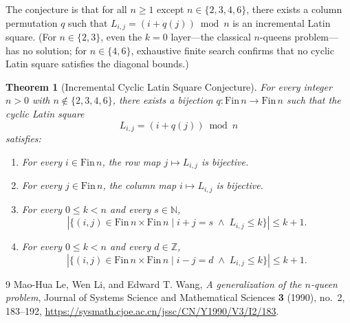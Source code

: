 \documentclass[11pt,a4paper]{article}
\newtheorem{theorem}{Theorem}[section]
\theoremstyle{remark}
\begin{document}
The conjecture is that for all $n \ge 1$ except $n \in \{2, 3, 4, 6\}$, there exists a column permutation $q$ such that $L_{i,j} = (i + q(j)) \bmod n$ is an incremental Latin square. (For $n \in \{2, 3\}$, even the $k = 0$ layer---the classical $n$-queens problem---has no solution; for $n \in \{4, 6\}$, exhaustive finite search confirms that no cyclic Latin square satisfies the diagonal bounds.)

\begin{theorem}[Incremental Cyclic Latin Square Conjecture]\label{thm:main}
For every integer $n > 0$ with $n \notin \{2, 3, 4, 6\}$, there exists a bijection $q : \mathrm{Fin}\,n \to \mathrm{Fin}\,n$ such that the cyclic Latin square
\[
  L_{i,j} = (i + q(j)) \bmod n
\]
satisfies:
\begin{enumerate}[nosep,label=(\roman*)]
  \item For every $i \in \mathrm{Fin}\,n$, the row map $j \mapsto L_{i,j}$ is bijective.
  \item For every $j \in \mathrm{Fin}\,n$, the column map $i \mapsto L_{i,j}$ is bijective.
  \item For every $0 \le k < n$ and every $s \in \mathbb{N}$,
  \[
    |\{(i,j) \in \mathrm{Fin}\,n \times \mathrm{Fin}\,n \mid i + j = s \;\land\; L_{i,j} \le k\}| \le k + 1.
  \]
  \item For every $0 \le k < n$ and every $d \in \mathbb{Z}$,
  \[
    |\{(i,j) \in \mathrm{Fin}\,n \times \mathrm{Fin}\,n \mid i - j = d \;\land\; L_{i,j} \le k\}| \le k + 1.
  \]
\end{enumerate}
\end{theorem}


\begin{thebibliography}{9}
Mao-Hua Le, Wen Li, and Edward T. Wang,
\emph{A generalization of the $n$-queen problem},
Journal of Systems Science and Mathematical Sciences \textbf{3} (1990), no.~2, 183--192,
\url{https://sysmath.cjoe.ac.cn/jssc/CN/Y1990/V3/I2/183}.
\end{thebibliography}
\end{document}
